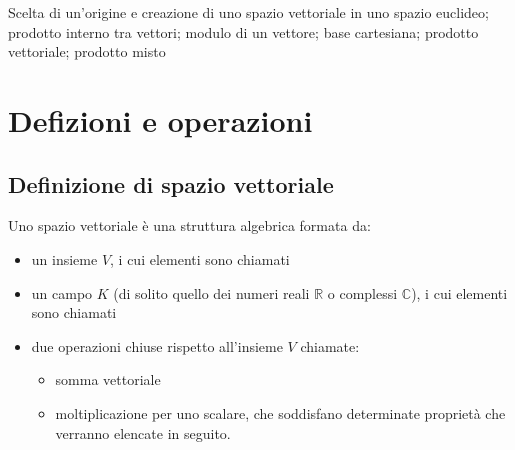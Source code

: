 \documentclass[letterpaper,10pt,italian]{jupyterBook}
\begin{document}
\sphinxAtStartPar
{\hyperref[\detokenize{ch/algebra::doc}]{}} Scelta di un’origine e creazione di uno spazio vettoriale in uno spazio euclideo; prodotto interno tra vettori;  modulo di un vettore; base cartesiana; prodotto vettoriale; prodotto misto



\sphinxstepscope




\section{Defizioni e operazioni}
\label{\detokenize{ch/algebra/vector-algebra-def:defizioni-e-operazioni}}\label{\detokenize{ch/algebra/vector-algebra-def:math-hs-algebra-vector-def}}\label{\detokenize{ch/algebra/vector-algebra-def::doc}}

\subsection{Definizione di spazio vettoriale}
\label{\detokenize{ch/algebra/vector-algebra-def:definizione-di-spazio-vettoriale}}\label{\detokenize{ch/algebra/vector-algebra-def:math-hs-algebra-vector-def-vector-space}}
\sphinxAtStartPar
Uno spazio vettoriale è una struttura algebrica formata da:
\begin{itemize}
\item {} 
\sphinxAtStartPar
un insieme \(V\), i cui elementi sono chiamati 

\item {} 
\sphinxAtStartPar
un campo \(K\) (di solito quello dei numeri reali \(\mathbb{R}\) o complessi \(\mathbb{C}\)), i cui elementi sono chiamati 

\item {} 
\sphinxAtStartPar
due operazioni chiuse rispetto all’insieme \(V\) chiamate:
\begin{itemize}
\item {} 
\sphinxAtStartPar
somma vettoriale

\item {} 
\sphinxAtStartPar
moltiplicazione per uno scalare,
che soddisfano determinate proprietà che verranno elencate in seguito.

\end{itemize}

\end{itemize}
\end{document}
